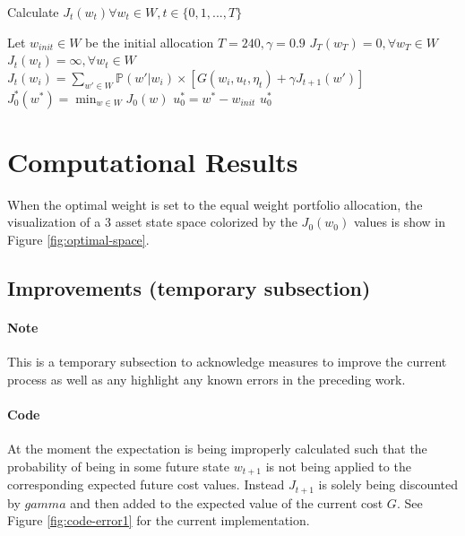 \documentclass{article}
\begin{document}
\begin{algorithm}
\caption{Calculate $J_t(w_t) \forall w_t \in W, t \in \{0, 1, ..., T\}$}
\label{al:value-iteration}
\begin{algorithmic}
	\STATE Let $w_{init} \in W$ be the initial allocation
	\STATE $T = 240, \gamma = 0.9$      
	\STATE $J_T(w_T) = 0, \forall w_T \in W$ 
		\STATE $J_t(w_t) = \infty, \forall w_t \in W$ 
			\STATE $J_t(w_i) = \sum_{w' \in W} \mathbb{P}(w' | w_i) \times [G(w_i, u_t, \eta_t) + \gamma J_{t+1}(w')]$
		\ENDFOR
	\ENDFOR	
	\STATE $J_0^*(w^*) = \min_{w \in W} J_0(w)$
	\STATE $u_0^* = w^* - w_{init}$
	\RETURN $u_0^*$
\end{algorithmic}
\end{algorithm}

\section{Computational Results}

When the optimal weight is set to the equal weight portfolio allocation, the visualization of a 3 asset state space colorized by the $J_0(w_0)$ values is show in Figure \ref{fig:optimal-space}.

\subsection{Improvements (temporary subsection)}

\paragraph{Note} This is a temporary subsection to acknowledge measures to improve the current process as well as any highlight any known errors in the preceding work.

\paragraph{Code} At the moment the expectation is being improperly calculated such that the probability of being in some future state $w_{t+1}$ is not being applied to the corresponding expected future cost values. Instead $J_{t+1}$ is solely being discounted by $gamma$ and then added to the expected value of the current cost $G$. See Figure \ref{fig:code-error1} for the current implementation.
\end{document}

